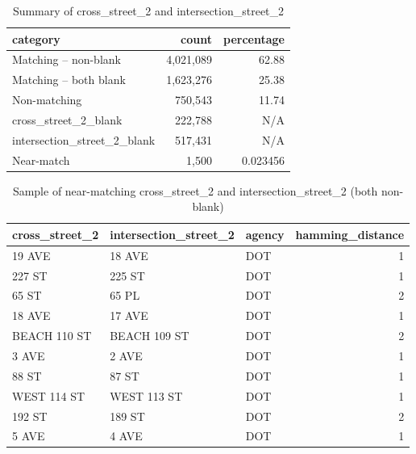 \documentclass[12pt, titlepage]{article}
\begin{document}
{\begin{table}[H]
    \centering
    \footnotesize
    \begin{tabular}{l r r}
        \toprule
        \textbf{category} & \textbf{count} & \textbf{percentage} \\
        \midrule
        Matching -- non-blank         & 4,021,089 & 62.88     \\
        Matching -- both blank  & 1,623,276 & 25.38     \\
        Non-matching                &   750,543 & 11.74     \\
        cross\_street\_2\_blank     &   222,788 & N/A       \\
        intersection\_street\_2\_blank &   517,431 & N/A       \\
        Near-match                  &     1,500 & 0.023456  \\
        \bottomrule
    \end{tabular}
    \caption{Summary of cross\_street\_2 and intersection\_street\_2}
    \label{tab:summary_cross_intersection_2}
\end{table}

\begin{table}[H]
    \centering
    \footnotesize
    \begin{tabular}{l l l r}
        \toprule
        \textbf{cross\_street\_2} & \textbf{intersection\_street\_2} & \textbf{agency} & \textbf{hamming\_distance} \\
        \midrule
        19 AVE         & 18 AVE                & DOT    & 1 \\
        227 ST         & 225 ST                & DOT    & 1 \\
        65 ST          & 65 PL                 & DOT    & 2 \\
        18 AVE         & 17 AVE                & DOT    & 1 \\
        BEACH 110 ST   & BEACH 109 ST          & DOT    & 2 \\
        3 AVE          & 2 AVE                 & DOT    & 1 \\
        88 ST          & 87 ST                 & DOT    & 1 \\
        WEST 114 ST    & WEST 113 ST           & DOT    & 1 \\
        192 ST         & 189 ST                & DOT    & 2 \\
        5 AVE          & 4 AVE                 & DOT    & 1 \\
        \bottomrule
    \end{tabular}
    \caption{Sample of near-matching cross\_street\_2 and intersection\_street\_2 (both non-blank)}
    \label{tab:near_matching_cross_intersection_2}
\end{table}


}
\end{document}
